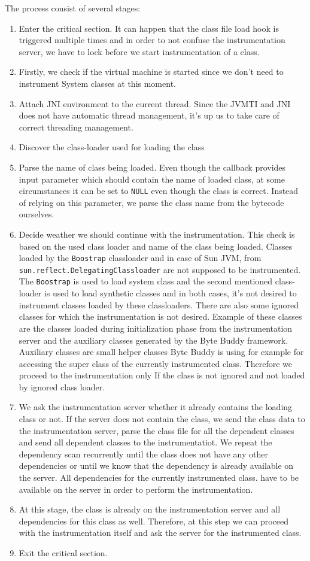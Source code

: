 The process consist of several stages:
\begin{enumerate}
	
	\item Enter the critical section. It can happen that the class file load hook is triggered multiple times and in order to not confuse the instrumentation server, we have to lock before we start instrumentation of a class.
	\item Firstly, we check if the virtual machine is started since we don't need to instrument System classes at this moment.
	\item Attach JNI environment to the current thread. Since the JVMTI and JNI does not have automatic thread management, it's up us to take care of correct threading management.
	\item Discover the class-loader used for loading the class
	\item Parse the name of class being loaded. Even though the callback provides input parameter which should contain the name of loaded class, at some circumstances it can be set to \texttt{NULL} even though the class is correct. Instead of relying on this parameter, we parse the class name from the bytecode ourselves.
	\item Decide weather we should continue with the instrumentation. This check is based on the used class loader and name of the class being loaded. Classes loaded by the \texttt{Boostrap} classloader and in case of Sun JVM, from \texttt{sun.reflect.DelegatingClassloader} are not supposed to be instrumented. 
	The \texttt{Boostrap} is used to load system class and the second mentioned class-loader is used to load synthetic classes and in both cases, it's not desired to instrument classes loaded by these classloaders.
	There are also some ignored classes for which the instrumentation is not desired. Example of these classes are the classes loaded during initialization phase from the instrumentation server and the auxiliary classes generated by the Byte Buddy framework. Auxiliary classes are small helper classes Byte Buddy is using for example for accessing the super class of the currently instrumented class. Therefore we proceed to the instrumentation only If the class is not ignored and not loaded by ignored class loader.
	\item We ask the instrumentation server whether it already contains the loading class or not. If the server does not contain the class, we send the class data to the instrumentation server, parse the class file for all the dependent classes and send all dependent classes to the instrumentatiot. We repeat the dependency scan recurrently until the class does not have any other dependencies or until  we know that the dependency is already available on the server. All dependencies for the currently instrumented class. have to be available on the server in order to perform the instrumentation.
	\item At this stage, the class is already on the instrumentation server and all dependencies for this class as well. Therefore, at this step we can proceed with the instrumentation itself and ask the server for the instrumented class.
	\item Exit the critical section.
\end{enumerate}	
